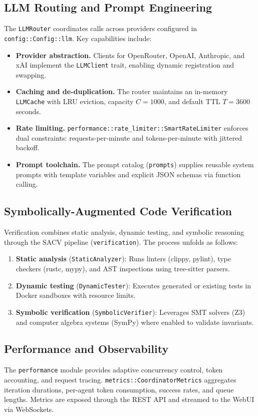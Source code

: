 \documentclass{ieeeaccess}
\begin{document}
\subsection{LLM Routing and Prompt Engineering}
The \texttt{LLMRouter} coordinates calls across providers configured in \texttt{config::Config::llm}. Key capabilities include:
\begin{itemize}
\item \textbf{Provider abstraction.} Clients for OpenRouter, OpenAI, Anthropic, and xAI implement the \texttt{LLMClient} trait, enabling dynamic registration and swapping.
\item \textbf{Caching and de-duplication.} The router maintains an in-memory \texttt{LLMCache} with LRU eviction, capacity \(C=1000\), and default TTL \(T=3600\) seconds.
\item \textbf{Rate limiting.} \texttt{performance::rate\_limiter::SmartRateLimiter} enforces dual constraints: requests-per-minute and tokens-per-minute with jittered backoff.
\item \textbf{Prompt toolchain.} The prompt catalog (\texttt{prompts}) supplies reusable system prompts with template variables and explicit JSON schemas via function calling.
\end{itemize}

\subsection{Symbolically-Augmented Code Verification}
Verification combines static analysis, dynamic testing, and symbolic reasoning through the SACV pipeline (\texttt{verification}). The process unfolds as follows:
\begin{enumerate}
\item \textbf{Static analysis} (\texttt{StaticAnalyzer}): Runs linters (clippy, pylint), type checkers (rustc, mypy), and AST inspections using tree-sitter parsers.
\item \textbf{Dynamic testing} (\texttt{DynamicTester}): Executes generated or existing tests in Docker sandboxes with resource limits.
\item \textbf{Symbolic verification} (\texttt{SymbolicVerifier}): Leverages SMT solvers (Z3) and computer algebra systems (SymPy) where enabled to validate invariants.
\end{enumerate}

\subsection{Performance and Observability}
The \texttt{performance} module provides adaptive concurrency control, token accounting, and request tracing. \texttt{metrics::CoordinatorMetrics} aggregates iteration durations, per-agent token consumption, success rates, and queue lengths. Metrics are exposed through the REST API and streamed to the WebUI via WebSockets.
\end{document}

